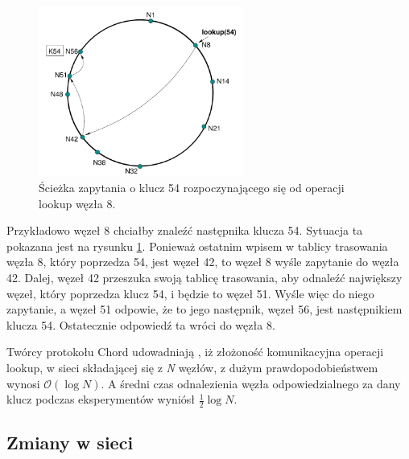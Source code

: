 \documentclass[12pt, twoside, openany]{report}
\begin{document}




\begin{figure}[H]
\centering
\includegraphics[width=0.6\textwidth,height=\textheight,keepaspectratio]{lookup_example.png}
\caption{Ścieżka zapytania o klucz 54 rozpoczynającego się od operacji lookup węzła 8.}
\label{fig:lookup_example}
\end{figure}

Przykładowo węzeł 8 chciałby znaleźć następnika klucza 54. Sytuacja ta pokazana jest na rysunku \ref{fig:lookup_example}. Ponieważ ostatnim wpisem w tablicy trasowania węzła 8, który poprzedza 54, jest węzeł 42, to węzeł 8 wyśle zapytanie do węzła 42. Dalej, węzeł 42 przeszuka swoją tablicę trasowania, aby odnaleźć największy węzeł, który poprzedza klucz 54, i będzie to węzeł 51. Wyśle więc do niego zapytanie, a węzeł 51 odpowie, że to jego następnik, węzeł 56, jest następnikiem klucza 54. Ostatecznie odpowiedź ta wróci do węzła 8.

Twórcy protokołu Chord udowadniają \cite{bib:chord}, iż złożoność komunikacyjna operacji lookup, w sieci składającej się z \textit{N} węzłów, z dużym prawdopodobieństwem wynosi $\mathcal{O}(\log{}N)$. A średni czas odnalezienia węzła odpowiedzialnego za dany klucz podczas eksperymentów wyniósł $\frac{1}{2} \log{} N$.

\subsection{Zmiany w sieci}
\end{document}
